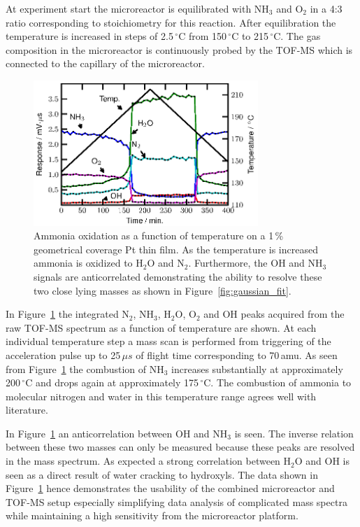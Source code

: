 \documentclass[aip,rsi]{revtex4-1}
\begin{document}
At experiment start the microreactor is equilibrated with NH$_3$ and O$_2$ in a 4:3 ratio corresponding to stoichiometry for this reaction. After equilibration the temperature is increased in steps of 2.5\,$^{\circ}$C from 150\,$^{\circ}$C to 215\,$^{\circ}$C. The gas composition in the microreactor is continuously probed by the TOF-MS which is connected to the capillary of the microreactor.
\begin{figure}
 \includegraphics[width=8.5cm]{ammonia_reactivity.eps}
 \caption{Ammonia oxidation as a function of temperature on a 1\,\% geometrical coverage Pt thin film. As the temperature is increased ammonia is oxidized to H$_2$O and N$_2$. Furthermore, the OH and NH$_3$ signals are anticorrelated demonstrating the ability to resolve these two close lying masses as shown in Figure~\ref{fig:gaussian_fit}.\label{fig:ammonia_reactivity}}
\end{figure}
In Figure~\ref{fig:ammonia_reactivity} the integrated N$_2$, NH$_3$, H$_2$O, O$_2$ and OH peaks acquired from the raw TOF-MS spectrum as a function of temperature are shown. At each individual temperature step a mass scan is performed from triggering of the acceleration pulse up to 25\,$\mu s$ of flight time corresponding to 70\,amu. As seen from Figure~\ref{fig:ammonia_reactivity} the combustion of NH$_3$ increases substantially at approximately 200\,$^{\circ}$C and drops again at approximately 175\,$^{\circ}$C. The combustion of ammonia to molecular nitrogen and water in this temperature range agrees well with literature\cite{Imbihl2007,Zeng2009}. 

In Figure~\ref{fig:ammonia_reactivity} an anticorrelation between OH and NH$_3$ is seen. The inverse relation between these two masses can only be measured because these peaks are resolved in the mass spectrum. As expected a strong correlation between H$_2$O and OH is seen as a direct result of water cracking to hydroxyls. The data shown in Figure~\ref{fig:ammonia_reactivity} hence demonstrates the usability of the combined microreactor and TOF-MS setup especially simplifying data analysis of complicated mass spectra while maintaining a high sensitivity from the microreactor platform.
\end{document}
